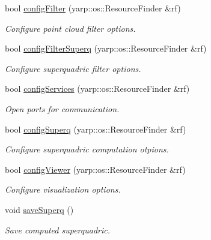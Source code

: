 \begin{DoxyCompactItemize}
\mbox{\label{classSuperqModule_abe9bafeec746eb23da8f89cada86849e}} 
bool \mbox{\hyperlink{classSuperqModule_abe9bafeec746eb23da8f89cada86849e}{config\+Filter}} (yarp\+::os\+::\+Resource\+Finder \&rf)
\begin{DoxyCompactList}\small\item\em Configure point cloud filter options. \end{DoxyCompactList}\item 
\mbox{\label{classSuperqModule_a706feb064c09186585a97422603e6278}} 
bool \mbox{\hyperlink{classSuperqModule_a706feb064c09186585a97422603e6278}{config\+Filter\+Superq}} (yarp\+::os\+::\+Resource\+Finder \&rf)
\begin{DoxyCompactList}\small\item\em Configure superquadric filter options. \end{DoxyCompactList}\item 
\mbox{\label{classSuperqModule_aa27116ca1ef35ae86459aad82f4c53cb}} 
bool \mbox{\hyperlink{classSuperqModule_aa27116ca1ef35ae86459aad82f4c53cb}{config\+Services}} (yarp\+::os\+::\+Resource\+Finder \&rf)
\begin{DoxyCompactList}\small\item\em Open ports for communication. \end{DoxyCompactList}\item 
\mbox{\label{classSuperqModule_a36f445a18edc230bcd119b098143204f}} 
bool \mbox{\hyperlink{classSuperqModule_a36f445a18edc230bcd119b098143204f}{config\+Superq}} (yarp\+::os\+::\+Resource\+Finder \&rf)
\begin{DoxyCompactList}\small\item\em Configure superquadric computation otpions. \end{DoxyCompactList}\item 
\mbox{\label{classSuperqModule_ac92cfd73d4a1e08013051681ccb2e687}} 
bool \mbox{\hyperlink{classSuperqModule_ac92cfd73d4a1e08013051681ccb2e687}{config\+Viewer}} (yarp\+::os\+::\+Resource\+Finder \&rf)
\begin{DoxyCompactList}\small\item\em Configure visualization options. \end{DoxyCompactList}\item 
\mbox{\label{classSuperqModule_ada9aa974cf680e4f6e5507c2dc463856}} 
void \mbox{\hyperlink{classSuperqModule_ada9aa974cf680e4f6e5507c2dc463856}{save\+Superq}} ()
\begin{DoxyCompactList}\small\item\em Save computed superquadric. \end{DoxyCompactList}\item 

\end{DoxyCompactItemize}
